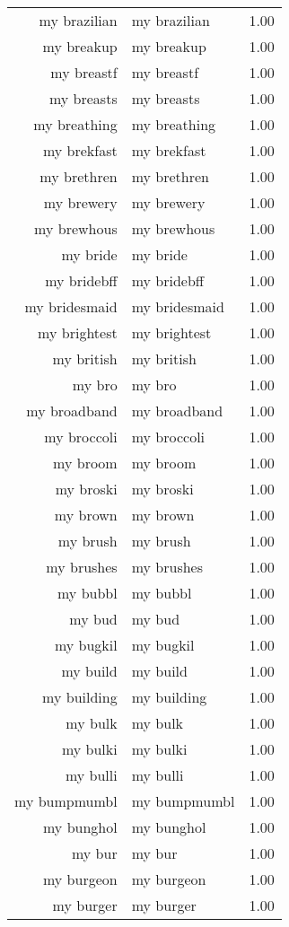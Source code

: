 \begin{table}[ht]
\begin{tabular}{rlr}
  my brazilian & my brazilian & 1.00 \\ 
  my breakup & my breakup & 1.00 \\ 
  my breastf & my breastf & 1.00 \\ 
  my breasts & my breasts & 1.00 \\ 
  my breathing & my breathing & 1.00 \\ 
  my brekfast & my brekfast & 1.00 \\ 
  my brethren & my brethren & 1.00 \\ 
  my brewery & my brewery & 1.00 \\ 
  my brewhous & my brewhous & 1.00 \\ 
  my bride & my bride & 1.00 \\ 
  my bridebff & my bridebff & 1.00 \\ 
  my bridesmaid & my bridesmaid & 1.00 \\ 
  my brightest & my brightest & 1.00 \\ 
  my british & my british & 1.00 \\ 
  my bro & my bro & 1.00 \\ 
  my broadband & my broadband & 1.00 \\ 
  my broccoli & my broccoli & 1.00 \\ 
  my broom & my broom & 1.00 \\ 
  my broski & my broski & 1.00 \\ 
  my brown & my brown & 1.00 \\ 
  my brush & my brush & 1.00 \\ 
  my brushes & my brushes & 1.00 \\ 
  my bubbl & my bubbl & 1.00 \\ 
  my bud & my bud & 1.00 \\ 
  my bugkil & my bugkil & 1.00 \\ 
  my build & my build & 1.00 \\ 
  my building & my building & 1.00 \\ 
  my bulk & my bulk & 1.00 \\ 
  my bulki & my bulki & 1.00 \\ 
  my bulli & my bulli & 1.00 \\ 
  my bumpmumbl & my bumpmumbl & 1.00 \\ 
  my bunghol & my bunghol & 1.00 \\ 
  my bur & my bur & 1.00 \\ 
  my burgeon & my burgeon & 1.00 \\ 
  my burger & my burger & 1.00 \\ 

\end{tabular}
\end{table}
